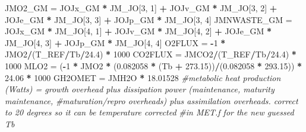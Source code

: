 \documentclass[]{article}
\newenvironment{Shaded}{\begin{snugshade}}{\end{snugshade}}
\newcommand{\DecValTok}[1]{\textcolor[rgb]{0.00,0.00,0.81}{#1}}
\newcommand{\FloatTok}[1]{\textcolor[rgb]{0.00,0.00,0.81}{#1}}
\newcommand{\StringTok}[1]{\textcolor[rgb]{0.31,0.60,0.02}{#1}}
\newcommand{\CommentTok}[1]{\textcolor[rgb]{0.56,0.35,0.01}{\textit{#1}}}
\newcommand{\OperatorTok}[1]{\textcolor[rgb]{0.81,0.36,0.00}{\textbf{#1}}}
\newcommand{\NormalTok}[1]{#1}
\begin{document}
\begin{Shaded}
\begin{Highlighting}[]
{{{\NormalTok{    JMO2_GM =}\StringTok{ }\NormalTok{JOJx_GM }\OperatorTok{*}\StringTok{ }\NormalTok{JM_JO[}\DecValTok{3}\NormalTok{, }\DecValTok{1}\NormalTok{] }\OperatorTok{+}\StringTok{ }\NormalTok{JOJv_GM }\OperatorTok{*}\StringTok{ }\NormalTok{JM_JO[}\DecValTok{3}\NormalTok{, }\DecValTok{2}\NormalTok{] }\OperatorTok{+}\StringTok{ }
\StringTok{        }\NormalTok{JOJe_GM }\OperatorTok{*}\StringTok{ }\NormalTok{JM_JO[}\DecValTok{3}\NormalTok{, }\DecValTok{3}\NormalTok{] }\OperatorTok{+}\StringTok{ }\NormalTok{JOJp_GM }\OperatorTok{*}\StringTok{ }\NormalTok{JM_JO[}\DecValTok{3}\NormalTok{, }\DecValTok{4}\NormalTok{]}
\NormalTok{    JMNWASTE_GM =}\StringTok{ }\NormalTok{JOJx_GM }\OperatorTok{*}\StringTok{ }\NormalTok{JM_JO[}\DecValTok{4}\NormalTok{, }\DecValTok{1}\NormalTok{] }\OperatorTok{+}\StringTok{ }\NormalTok{JOJv_GM }\OperatorTok{*}\StringTok{ }\NormalTok{JM_JO[}\DecValTok{4}\NormalTok{, }
        \DecValTok{2}\NormalTok{] }\OperatorTok{+}\StringTok{ }\NormalTok{JOJe_GM }\OperatorTok{*}\StringTok{ }\NormalTok{JM_JO[}\DecValTok{4}\NormalTok{, }\DecValTok{3}\NormalTok{] }\OperatorTok{+}\StringTok{ }\NormalTok{JOJp_GM }\OperatorTok{*}\StringTok{ }\NormalTok{JM_JO[}\DecValTok{4}\NormalTok{, }\DecValTok{4}\NormalTok{]}
\NormalTok{    O2FLUX =}\StringTok{ }\OperatorTok{-}\DecValTok{1} \OperatorTok{*}\StringTok{ }\NormalTok{JMO2}\OperatorTok{/}\NormalTok{(T_REF}\OperatorTok{/}\NormalTok{Tb}\OperatorTok{/}\FloatTok{24.4}\NormalTok{) }\OperatorTok{*}\StringTok{ }\DecValTok{1000}
\NormalTok{    CO2FLUX =}\StringTok{ }\NormalTok{JMCO2}\OperatorTok{/}\NormalTok{(T_REF}\OperatorTok{/}\NormalTok{Tb}\OperatorTok{/}\FloatTok{24.4}\NormalTok{) }\OperatorTok{*}\StringTok{ }\DecValTok{1000}
\NormalTok{    MLO2 =}\StringTok{ }\NormalTok{(}\OperatorTok{-}\DecValTok{1} \OperatorTok{*}\StringTok{ }\NormalTok{JMO2 }\OperatorTok{*}\StringTok{ }\NormalTok{(}\FloatTok{0.082058} \OperatorTok{*}\StringTok{ }\NormalTok{(Tb }\OperatorTok{+}\StringTok{ }\FloatTok{273.15}\NormalTok{))}\OperatorTok{/}\NormalTok{(}\FloatTok{0.082058} \OperatorTok{*}\StringTok{ }
\StringTok{        }\FloatTok{293.15}\NormalTok{)) }\OperatorTok{*}\StringTok{ }\FloatTok{24.06} \OperatorTok{*}\StringTok{ }\DecValTok{1000}
\NormalTok{    GH2OMET =}\StringTok{ }\NormalTok{JMH2O }\OperatorTok{*}\StringTok{ }\FloatTok{18.01528}
    \CommentTok{#metabolic heat production (Watts) = growth overhead plus dissipation power (maintenance, maturity maintenance,}
  \CommentTok{#maturation/repro overheads) plus assimilation overheads. correct to 20 degrees so it can be temperature corrected}
  \CommentTok{#in MET.f for the new guessed Tb}
}}}
\end{Highlighting}
\end{Shaded}
\end{document}
